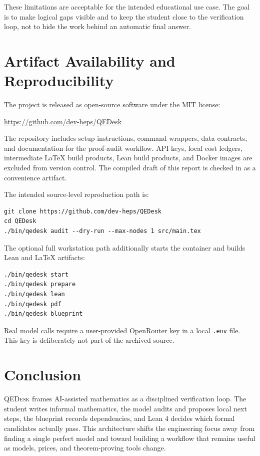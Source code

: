 \documentclass[11pt]{article}
\newcommand{\qedesk}{\textsc{QEDesk}}
\newcommand{\lean}{Lean 4}
\begin{document}
These limitations are acceptable for the intended educational use case.  The
goal is to make logical gaps visible and to keep the student close to the
verification loop, not to hide the work behind an automatic final answer.

\section{Artifact Availability and Reproducibility}

The project is released as open-source software under the MIT license:

\begin{center}
\url{https://github.com/dev-heps/QEDesk}
\end{center}

The repository includes setup instructions, command wrappers, data contracts,
and documentation for the proof-audit workflow.  API keys, local cost ledgers,
intermediate LaTeX build products, Lean build products, and Docker images are
excluded from version control.  The compiled draft of this report is checked in
as a convenience artifact.

The intended source-level reproduction path is:

\begin{lstlisting}
git clone https://github.com/dev-heps/QEDesk
cd QEDesk
./bin/qedesk audit --dry-run --max-nodes 1 src/main.tex
\end{lstlisting}

The optional full workstation path additionally starts the container and builds
Lean and LaTeX artifacts:

\begin{lstlisting}
./bin/qedesk start
./bin/qedesk prepare
./bin/qedesk lean
./bin/qedesk pdf
./bin/qedesk blueprint
\end{lstlisting}

Real model calls require a user-provided OpenRouter key in a local
\texttt{.env} file.  This key is deliberately not part of the archived source.

\section{Conclusion}

\qedesk{} frames AI-assisted mathematics as a disciplined verification loop.
The student writes informal mathematics, the model audits and proposes local
next steps, the blueprint records dependencies, and \lean{} decides which
formal candidates actually pass.  This architecture shifts the engineering
focus away from finding a single perfect model and toward building a workflow
that remains useful as models, prices, and theorem-proving tools change.
\end{document}
